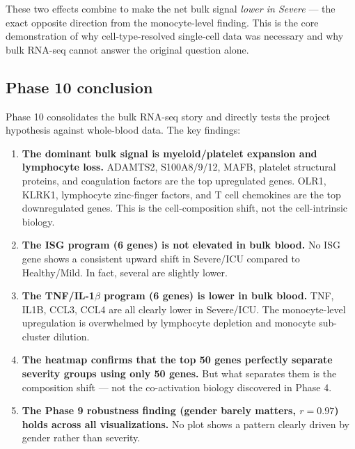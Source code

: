 \documentclass[11pt, a4paper]{article}
\begin{document}
These two effects combine to make the net bulk signal \textit{lower in Severe} —
the exact opposite direction from the monocyte-level finding.
This is the core demonstration of why cell-type-resolved single-cell data
was necessary and why bulk RNA-seq cannot answer the original question alone.

\subsection{Phase 10 conclusion}

Phase 10 consolidates the bulk RNA-seq story and directly tests the project hypothesis
against whole-blood data. The key findings:

\begin{enumerate}[nosep]
  \item \textbf{The dominant bulk signal is myeloid/platelet expansion and
        lymphocyte loss.}
        ADAMTS2, S100A8/9/12, MAFB, platelet structural proteins, and
        coagulation factors are the top upregulated genes. OLR1, KLRK1,
        lymphocyte zinc-finger factors, and T cell chemokines are the
        top downregulated genes. This is the cell-composition shift,
        not the cell-intrinsic biology.

  \item \textbf{The ISG program (6 genes) is not elevated in bulk blood.}
        No ISG gene shows a consistent upward shift in Severe/ICU compared
        to Healthy/Mild. In fact, several are slightly lower.

  \item \textbf{The TNF/IL-1$\beta$ program (6 genes) is lower in bulk blood.}
        TNF, IL1B, CCL3, CCL4 are all clearly lower in Severe/ICU.
        The monocyte-level upregulation is overwhelmed by lymphocyte depletion
        and monocyte sub-cluster dilution.

  \item \textbf{The heatmap confirms that the top 50 genes perfectly separate
        severity groups using only 50 genes.}
        But what separates them is the composition shift — not the co-activation
        biology discovered in Phase 4.

  \item \textbf{The Phase 9 robustness finding (gender barely matters, $r = 0.97$)
        holds across all visualizations.}
        No plot shows a pattern clearly driven by gender rather than severity.
\end{enumerate}
\end{document}
